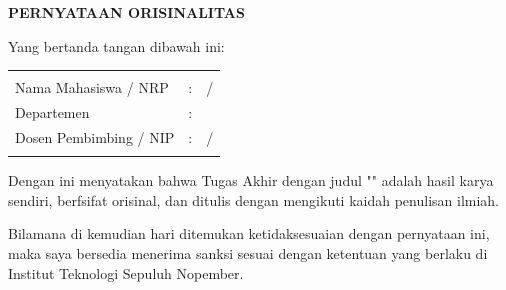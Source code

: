 \begin{center}
  \large
  \textbf{PERNYATAAN ORISINALITAS}
\end{center}

\thispagestyle{empty}

\vspace{2ex}


\noindent Yang bertanda tangan dibawah ini:

\noindent\begin{tabularx}{\textwidth}{l l X}
                         &   &                            \\
  Nama Mahasiswa / NRP   & : & \name{} / \nrp{}           \\
  Departemen             & : & \department{}              \\
  Dosen Pembimbing / NIP & : & \advisor{} / \advisornip{} \\
                         &   &                            \\
\end{tabularx}

Dengan ini menyatakan bahwa Tugas Akhir dengan judul "\tatitle{}" adalah hasil karya sendiri, berfsifat orisinal, dan ditulis dengan mengikuti kaidah penulisan ilmiah.

Bilamana di kemudian hari ditemukan ketidaksesuaian dengan pernyataan ini, maka saya bersedia menerima sanksi sesuai dengan ketentuan yang berlaku di Institut Teknologi Sepuluh Nopember.

\vspace{8ex}

